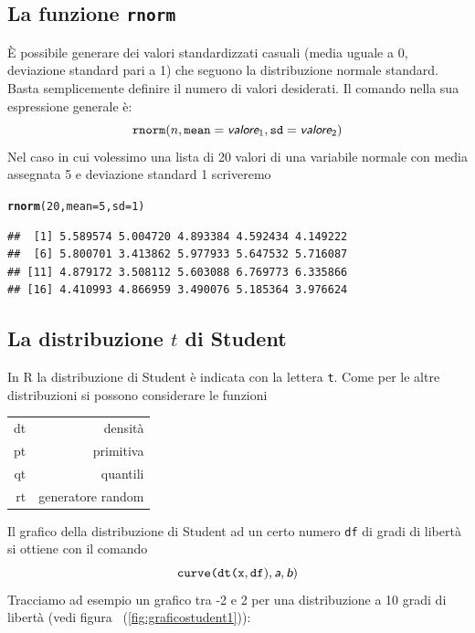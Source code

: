 \documentclass[onecolumn,12pt]{book}\usepackage[]{graphicx}\usepackage[]{color}
\makeatletter
\newcommand{\hlnum}[1]{\textcolor[rgb]{0.686,0.059,0.569}{#1}}%
\newcommand{\hlstd}[1]{\textcolor[rgb]{0.345,0.345,0.345}{#1}}%
\newcommand{\hlkwc}[1]{\textcolor[rgb]{0.333,0.667,0.333}{#1}}%
\newcommand{\hlkwd}[1]{\textcolor[rgb]{0.737,0.353,0.396}{\textbf{#1}}}%
\newenvironment{kframe}{%
 \def\at@end@of@kframe{}%
 \ifinner\ifhmode%
  \def\at@end@of@kframe{\end{minipage}}%
  \begin{minipage}{\columnwidth}%
 \fi\fi%
 \def\FrameCommand##1{\hskip\@totalleftmargin \hskip-\fboxsep
 \colorbox{shadecolor}{##1}\hskip-\fboxsep
     \hskip-\linewidth \hskip-\@totalleftmargin \hskip\columnwidth}%
 \MakeFramed {\advance\hsize-\width
   \@totalleftmargin\z@ \linewidth\hsize
   \@setminipage}}%
 {\par\unskip\endMakeFramed%
 \at@end@of@kframe}
\newenvironment{knitrout}{}{} %
\newcommand{\varia}[1]{\textsl{\textsf{#1}}}
\makeatother
\begin{document}
 \subsection{La funzione \texttt{rnorm}}
\`E possibile generare dei valori standardizzati casuali (media uguale a 0, deviazione standard pari a 1) che seguono la distribuzione normale standard. Basta semplicemente definire il numero di valori desiderati.
Il comando nella sua espressione generale \`e:
\begin{equation}\texttt{rnorm}(n,\texttt{mean}=\varia{valore}_1,\texttt{sd}=\varia{valore}_2)\end{equation}
Nel caso in cui volessimo una lista di 20 valori di una variabile normale con media assegnata 5 e deviazione standard 1 scriveremo
\begin{knitrout}
\color{fgcolor}\begin{kframe}
\begin{alltt}
\hlkwd{rnorm}\hlstd{(}\hlnum{20}\hlstd{,}\hlkwc{mean}\hlstd{=}\hlnum{5}\hlstd{,}\hlkwc{sd}\hlstd{=}\hlnum{1}\hlstd{)}
\end{alltt}
\begin{verbatim}
##  [1] 5.589574 5.004720 4.893384 4.592434 4.149222
##  [6] 5.800701 3.413862 5.977933 5.647532 5.716087
## [11] 4.879172 3.508112 5.603088 6.769773 6.335866
## [16] 4.410993 4.866959 3.490076 5.185364 3.976624
\end{verbatim}
\end{kframe}
\end{knitrout}
\subsection{La distribuzione $t$ di Student}
In \textsf{R} la distribuzione di Student \`e indicata con la lettera  \texttt{t}.  Come per le altre distribuzioni  si possono considerare le funzioni\vskip5pt
\begin{tabular}{|r|r |}
\hline
dt  &densit\`a\\
pt  &primitiva\\
qt & quantili\\
rt  &generatore random\\
\hline
\end{tabular}
\vskip10pt
Il grafico della distribuzione di Student ad un certo numero \texttt{df} di gradi di libert\`a  si ottiene con il comando
\begin{equation*}
\texttt{curve(dt(x},\texttt{df}),\varia{a},\varia{b})
\end{equation*}
Tracciamo ad esempio un grafico tra -2 e 2 per una distribuzione a 10 gradi di libert\`a (vedi figura ~(\ref{fig:graficostudent1})):
\end{document}
